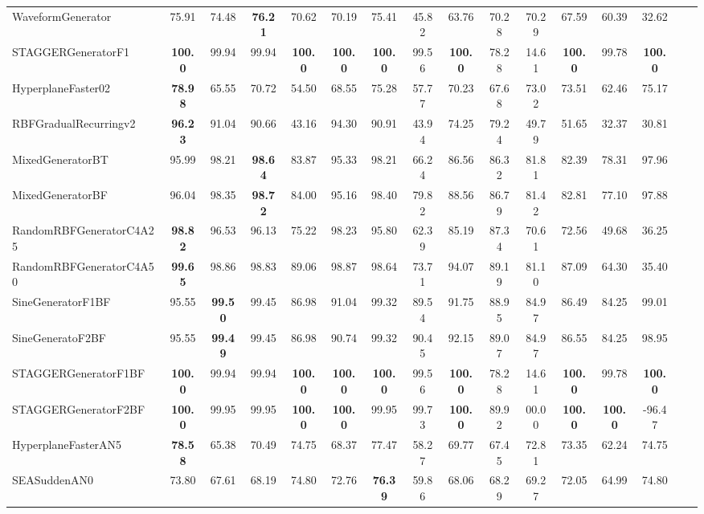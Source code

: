 \documentclass[reqno]{vcuthesis}
\numberwithin{equation}{chapter}
\begin{document}
\begin{table}[b!]
{\begin{tabularx}{1.45\textwidth}{l@{\extracolsep{\fill}}ccccccccccccccc}
WaveformGenerator  & 75.91 & 74.48 &  \textbf{76.21}  & 70.62 & 70.19 & 75.41 & 45.82 & 63.76 & 70.28 & 70.29 & 67.59 & 60.39 & 32.62 &   \\
STAGGERGeneratorF1  &  \textbf{100.0}  & 99.94 & 99.94 &  \textbf{100.0}  &  \textbf{100.0}  &  \textbf{100.0}  & 99.56 &  \textbf{100.0}  & 78.28 & 14.61 &  \textbf{100.0}  & 99.78 &  \textbf{100.0}  &   \\
HyperplaneFaster02  &  \textbf{78.98}  & 65.55 & 70.72 & 54.50 & 68.55 & 75.28 & 57.77 & 70.23 & 67.68 & 73.02 & 73.51 & 62.46 & 75.17 &   \\
RBFGradualRecurringv2  &  \textbf{96.23}  & 91.04 & 90.66 & 43.16 & 94.30 & 90.91 & 43.94 & 74.25 & 79.24 & 49.79 & 51.65 & 32.37 & 30.81 & \\   
MixedGeneratorBT  & 95.99 & 98.21 &  \textbf{98.64}  & 83.87 & 95.33 & 98.21 & 66.24 & 86.56 & 86.32 & 81.81 & 82.39 & 78.31 & 97.96 &   \\
MixedGeneratorBF  & 96.04 & 98.35 &  \textbf{98.72}  & 84.00 & 95.16 & 98.40 & 79.82 & 88.56 & 86.79 & 81.42 & 82.81 & 77.10 & 97.88 &   \\
RandomRBFGeneratorC4A25  &  \textbf{98.82}  & 96.53 & 96.13 & 75.22 & 98.23 & 95.80 & 62.39 & 85.19 & 87.34 & 70.61 & 72.56 & 49.68 & 36.25 &   \\
RandomRBFGeneratorC4A50  &  \textbf{99.65}  & 98.86 & 98.83 & 89.06 & 98.87 & 98.64 & 73.71 & 94.07 & 89.19 & 81.10 & 87.09 & 64.30 & 35.40 &   \\
SineGeneratorF1BF  & 95.55 &  \textbf{99.50}  & 99.45 & 86.98 & 91.04 & 99.32 & 89.54 & 91.75 & 88.95 & 84.97 & 86.49 & 84.25 & 99.01 &   \\
SineGeneratoF2BF  & 95.55 &  \textbf{99.49}  & 99.45 & 86.98 & 90.74 & 99.32 & 90.45 & 92.15 & 89.07 & 84.97 & 86.55 & 84.25 & 98.95 &   \\
STAGGERGeneratorF1BF  &  \textbf{100.0}  & 99.94 & 99.94 &  \textbf{100.0}  &  \textbf{100.0}  &  \textbf{100.0}  & 99.56 &  \textbf{100.0}  & 78.28 & 14.61 &  \textbf{100.0}  & 99.78 &  \textbf{100.0}  &   \\
STAGGERGeneratorF2BF  &  \textbf{100.0}  & 99.95 & 99.95 &  \textbf{100.0}  &  \textbf{100.0}  & 99.95 & 99.73 &  \textbf{100.0}  & 89.92 & 00.00 &  \textbf{100.0}  &  \textbf{100.0}  & -96.47 &   \\
HyperplaneFasterAN5  &  \textbf{78.58}  & 65.38 & 70.49 & 74.75 & 68.37 & 77.47 & 58.27 & 69.77 & 67.45 & 72.81 & 73.35 & 62.24 & 74.75 &   \\
SEASuddenAN0  & 73.80 & 67.61 & 68.19 & 74.80 & 72.76 &  \textbf{76.39}  & 59.86 & 68.06 & 68.29 & 69.27 & 72.05 & 64.99 & 74.80 &   \\

\end{tabularx}}
\end{table}
\end{document}
